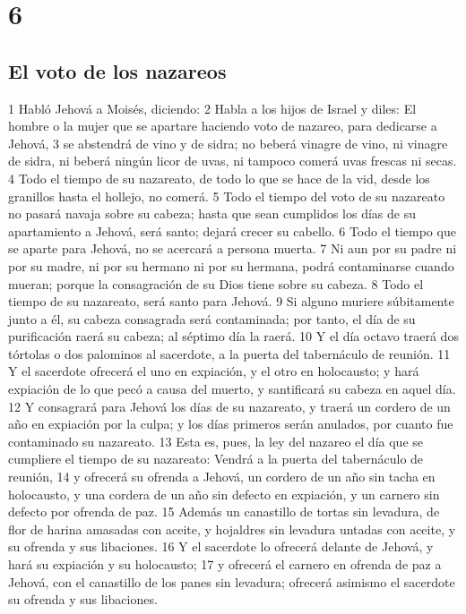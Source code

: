 \chapter{6}

\section*{El voto de los nazareos}

1 Habló Jehová a Moisés, diciendo:
2 Habla a los hijos de Israel y diles: El hombre o la mujer que se apartare haciendo voto de nazareo, para dedicarse a Jehová,
3 se abstendrá de vino y de sidra; no beberá vinagre de vino, ni vinagre de sidra, ni beberá ningún licor de uvas, ni tampoco comerá uvas frescas ni secas.
4 Todo el tiempo de su nazareato, de todo lo que se hace de la vid, desde los granillos hasta el hollejo, no comerá.
5 Todo el tiempo del voto de su nazareato no pasará navaja sobre su cabeza; hasta que sean cumplidos los días de su apartamiento a Jehová, será santo; dejará crecer su cabello.
6 Todo el tiempo que se aparte para Jehová, no se acercará a persona muerta.
7 Ni aun por su padre ni por su madre, ni por su hermano ni por su hermana, podrá contaminarse cuando mueran; porque la consagración de su Dios tiene sobre su cabeza.
8 Todo el tiempo de su nazareato, será santo para Jehová.
9 Si alguno muriere súbitamente junto a él, su cabeza consagrada será contaminada; por tanto, el día de su purificación raerá su cabeza; al séptimo día la raerá.
10 Y el día octavo traerá dos tórtolas o dos palominos al sacerdote, a la puerta del tabernáculo de reunión.
11 Y el sacerdote ofrecerá el uno en expiación, y el otro en holocausto; y hará expiación de lo que pecó a causa del muerto, y santificará su cabeza en aquel día.
12 Y consagrará para Jehová los días de su nazareato, y traerá un cordero de un año en expiación por la culpa; y los días primeros serán anulados, por cuanto fue contaminado su nazareato.
13 Esta es, pues, la ley del nazareo el día que se cumpliere el tiempo de su nazareato: Vendrá a la puerta del tabernáculo de reunión,
14 y ofrecerá su ofrenda a Jehová, un cordero de un año sin tacha en holocausto, y una cordera de un año sin defecto en expiación, y un carnero sin defecto por ofrenda de paz.
15 Además un canastillo de tortas sin levadura, de flor de harina amasadas con aceite, y hojaldres sin levadura untadas con aceite, y su ofrenda y sus libaciones.
16 Y el sacerdote lo ofrecerá delante de Jehová, y hará su expiación y su holocausto;
17 y ofrecerá el carnero en ofrenda de paz a Jehová, con el canastillo de los panes sin levadura; ofrecerá asimismo el sacerdote su ofrenda y sus libaciones.
